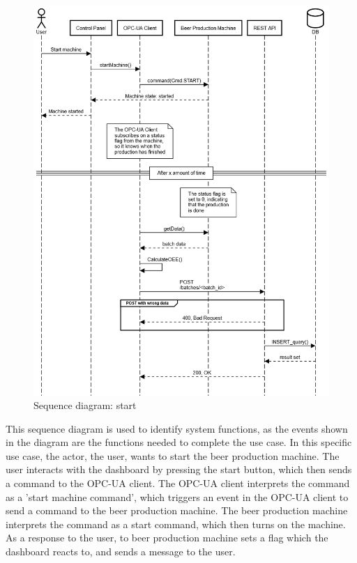 \begin{figure}[H]
\centering 
\includegraphics[width=1\linewidth]{images/sequence_operation/start.png}
\caption{Sequence diagram: start}
\label{figure:sequence_diagram} 
\end{figure}

This sequence diagram is used to identify system functions, as the events shown
in the diagram are the functions needed to complete the use case. In this
specific use case, the actor, the user, wants to start the beer production
machine. The user interacts with the dashboard by pressing the start button,
which then sends a command to the OPC-UA client. The OPC-UA client interprets
the command as a 'start machine command', which triggers an event in the OPC-UA
client to send a command to the beer production machine. The beer production
machine interprets the command as a start command, which then turns on the 
machine. As a response to the user, to beer production machine sets a flag
which the dashboard reacts to, and sends a message to the user. \\

